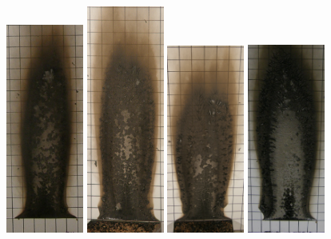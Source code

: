 \documentclass[twoside]{uocthesis}
\begin{document}
{\begin{figure}[p]
	\includegraphics[width=1.0in]{../Figures/GBNG6_P5120160}
	\includegraphics[width=1.0in]{../Figures/GBNG7_P5120172}
	\includegraphics[width=1.0in]{../Figures/GBNG8_P5120196}
	\includegraphics[width=1.0in]{../Figures/GBNG10_P5120251}

\end{figure}}
\end{document}
